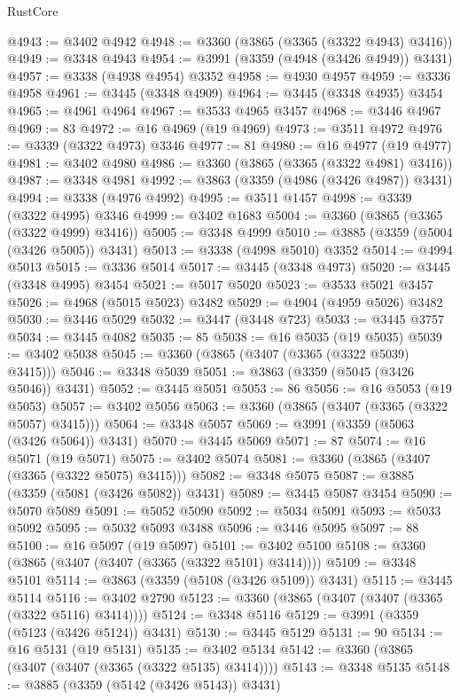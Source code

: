 \begin{lexlean}{RustCore}
\begin{coremodule}
@4943 := @3402 @4942
@4948 := @3360 (@3865 (@3365 (@3322 @4943) @3416))
@4949 := @3348 @4943
@4954 := @3991 (@3359 (@4948 (@3426 @4949)) @3431)
@4957 := @3338 (@4938 @4954) @3352
@4958 := @4930 @4957
@4959 := @3336 @4958
@4961 := @3445 (@3348 @4909)
@4964 := @3445 (@3348 @4935) @3454
@4965 := @4961 @4964
@4967 := @3533 @4965 @3457
@4968 := @3446 @4967
@4969 := 83
@4972 := @16 @4969 (@19 @4969)
@4973 := @3511 @4972
@4976 := @3339 (@3322 @4973) @3346
@4977 := 81
@4980 := @16 @4977 (@19 @4977)
@4981 := @3402 @4980
@4986 := @3360 (@3865 (@3365 (@3322 @4981) @3416))
@4987 := @3348 @4981
@4992 := @3863 (@3359 (@4986 (@3426 @4987)) @3431)
@4994 := @3338 (@4976 @4992)
@4995 := @3511 @1457
@4998 := @3339 (@3322 @4995) @3346
@4999 := @3402 @1683
@5004 := @3360 (@3865 (@3365 (@3322 @4999) @3416))
@5005 := @3348 @4999
@5010 := @3885 (@3359 (@5004 (@3426 @5005)) @3431)
@5013 := @3338 (@4998 @5010) @3352
@5014 := @4994 @5013
@5015 := @3336 @5014
@5017 := @3445 (@3348 @4973)
@5020 := @3445 (@3348 @4995) @3454
@5021 := @5017 @5020
@5023 := @3533 @5021 @3457
@5026 := @4968 (@5015 @5023) @3482
@5029 := @4904 (@4959 @5026) @3482
@5030 := @3446 @5029
@5032 := @3447 (@3448 @723)
@5033 := @3445 @3757
@5034 := @3445 @4082
@5035 := 85
@5038 := @16 @5035 (@19 @5035)
@5039 := @3402 @5038
@5045 := @3360 (@3865 (@3407 (@3365 (@3322 @5039) @3415)))
@5046 := @3348 @5039
@5051 := @3863 (@3359 (@5045 (@3426 @5046)) @3431)
@5052 := @3445 @5051
@5053 := 86
@5056 := @16 @5053 (@19 @5053)
@5057 := @3402 @5056
@5063 := @3360 (@3865 (@3407 (@3365 (@3322 @5057) @3415)))
@5064 := @3348 @5057
@5069 := @3991 (@3359 (@5063 (@3426 @5064)) @3431)
@5070 := @3445 @5069
@5071 := 87
@5074 := @16 @5071 (@19 @5071)
@5075 := @3402 @5074
@5081 := @3360 (@3865 (@3407 (@3365 (@3322 @5075) @3415)))
@5082 := @3348 @5075
@5087 := @3885 (@3359 (@5081 (@3426 @5082)) @3431)
@5089 := @3445 @5087 @3454
@5090 := @5070 @5089
@5091 := @5052 @5090
@5092 := @5034 @5091
@5093 := @5033 @5092
@5095 := @5032 @5093 @3488
@5096 := @3446 @5095
@5097 := 88
@5100 := @16 @5097 (@19 @5097)
@5101 := @3402 @5100
@5108 := @3360 (@3865 (@3407 (@3407 (@3365 (@3322 @5101) @3414))))
@5109 := @3348 @5101
@5114 := @3863 (@3359 (@5108 (@3426 @5109)) @3431)
@5115 := @3445 @5114
@5116 := @3402 @2790
@5123 := @3360 (@3865 (@3407 (@3407 (@3365 (@3322 @5116) @3414))))
@5124 := @3348 @5116
@5129 := @3991 (@3359 (@5123 (@3426 @5124)) @3431)
@5130 := @3445 @5129
@5131 := 90
@5134 := @16 @5131 (@19 @5131)
@5135 := @3402 @5134
@5142 := @3360 (@3865 (@3407 (@3407 (@3365 (@3322 @5135) @3414))))
@5143 := @3348 @5135
@5148 := @3885 (@3359 (@5142 (@3426 @5143)) @3431)

\end{coremodule}
\end{lexlean}

